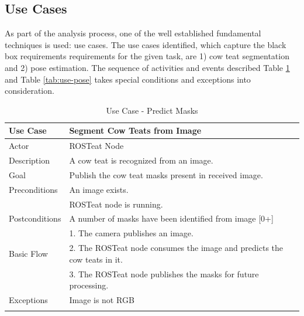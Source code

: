 \subsection{Use Cases}
As part of the analysis process, one of the well established fundamental techniques is used: use cases. The use cases identified, which capture the black box requirements requirements for the given task, are 1) cow teat segmentation and 2) pose estimation. The sequence of activities and events described Table \ref{tab:use-segment} and Table \ref{tab:use-pose} takes special conditions and exceptions into consideration.

\begin{longtable}{@{} p{3.5cm} p{10.5cm} @{}} \toprule
\textbf{Use Case}       & \textbf{Segment Cow Teats from Image} \\ \midrule
Actor                   & ROSTeat Node \\ \cmidrule{1-2}
Description             & A cow teat is recognized from an image. \\ \cmidrule{1-2}
Goal                    & Publish the cow teat masks present in received image. \\ \cmidrule{1-2}
Preconditions           & An image exists. \\ 
                        & ROSTeat node is running. \\ \cmidrule{1-2} 
Postconditions          & A number of masks have been identified from image [0+]\\ \cmidrule{1-2} 
                        & 1. The camera publishes an image. \\ 
Basic Flow              & 2. The ROSTeat node consumes the image and predicts the cow teats in it. \\
                        & 3. The ROSTeat node publishes the masks for future processing. \\ \cmidrule{1-2}
Exceptions             & Image is not RGB \\ \bottomrule
\caption{Use Case - Predict Masks} \label{tab:use-segment} \\
\end{longtable}

